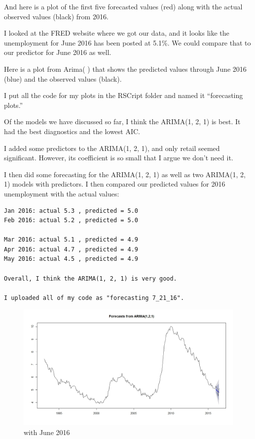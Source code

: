 \documentclass[twoside,twocolumn]{article}
\begin{document}
 And here is a plot of the first five forecasted values (red) along with the actual observed values (black) from 2016. 
 
 I looked at the FRED website where we got our data, and it looks like the unemployment for June 2016 has been posted at 5.1\%. We could compare that to our predictor for June 2016 as well.

Here is a plot from Arima( ) that shows the predicted values through June 2016 (blue) and the observed values (black).

I put all the code for my plots in the RSCript folder and named it ``forecasting plots.''


Of the models we have discussed so far, I think the ARIMA(1, 2, 1) is best. It had the best diagnostics and the lowest AIC.

I added some predictors to the ARIMA(1, 2, 1), and only retail seemed significant. However, its coefficient is so small that I argue we don't need it.

I then did some forecasting for the ARIMA(1, 2, 1) as well as two ARIMA(1, 2, 1) models with predictors. I then compared our predicted values for 2016 unemployment with the actual values:

\begin{verbatim}
Jan 2016: actual 5.3 , predicted = 5.0
Feb 2016: actual 5.2 , predicted = 5.0

Mar 2016: actual 5.1 , predicted = 4.9
Apr 2016: actual 4.7 , predicted = 4.9
May 2016: actual 4.5 , predicted = 4.9

Overall, I think the ARIMA(1, 2, 1) is very good.

I uploaded all of my code as "forecasting 7_21_16".

\end{verbatim}

  \begin{figure}[H]
    	\centering
     	\caption{with June 2016}
     	\includegraphics[width=\linewidth]{images/forejune}
 \end{figure}
 
\end{document}
